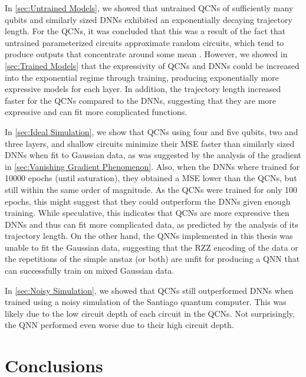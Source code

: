 In \autoref{sec:Untrained Models}, we showed that untrained QCNs of sufficiently many qubits and similarly sized DNNs exhibited an exponentially decaying trajectory length. For the QCNs, it was concluded that this was a result of the fact that untrained parameterized circuits approximate random circuits, which tend to produce outputs that concentrate around some mean \cite{McClean_2018}. However, we showed in \autoref{sec:Trained Models} that the expressivity of QCNs and DNNs could be increased into the exponential regime through training, producing exponentially more expressive models for each layer. In addition, the trajectory length increased faster for the QCNs compared to the DNNs, suggesting that they are more expressive and can fit more complicated functions.

In \autoref{sec:Ideal Simulation}, we show that QCNs using four and five qubits, two and three layers, and shallow circuits minimize their MSE faster than similarly sized DNNs when fit to Gaussian data, as was suggested by the analysis of the gradient in \autoref{sec:Vanishing Gradient Phenomenon}. Also, when the DNNs where trained for 10000 epochs (until saturation), they obtained a MSE lower than the QCNs, but still within the same order of magnitude. As the QCNs were trained for only 100 epochs, this might suggest that they could outperform the DNNs given enough training. While speculative, this indicates that QCNs are more expressive then DNNs and thus can fit more complicated data, as predicted by the analysis of its trajectory length. On the other hand, the QNNs implemented in this thesis was unable to fit the Gaussian data, suggesting that the RZZ encoding of the data or the repetitions of the simple anstaz (or both) are unfit for producing a QNN that can successfully train on mixed Gaussian data. 

In \autoref{sec:Noisy Simulation}, we showed that QCNs still outperformed DNNs when trained using a noisy simulation of the Santiago quantum computer. This was likely due to the low circuit depth of each circuit in the QCNs. Not surprisingly, the QNN performed even worse due to their high circuit depth.   


\section{Conclusions}\label{sec:conclusion}


